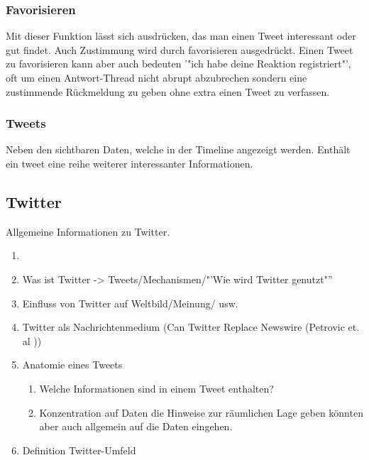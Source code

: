 		\subsubsection{Favorisieren}
			Mit dieser Funktion lässt sich ausdrücken, das man einen Tweet interessant oder gut findet.
			Auch Zustimmung wird durch favorisieren ausgedrückt.  
			Einen Tweet zu favorisieren kann aber auch bedeuten '"ich habe deine Reaktion registriert"', oft um einen Antwort-Thread nicht abrupt abzubrechen sondern eine zustimmende Rückmeldung zu geben ohne extra einen Tweet zu verfassen.

 		
	 	\subsubsection{Tweets}
	 		Neben den sichtbaren Daten, welche in der Timeline angezeigt werden. 
	 		Enthält ein tweet eine reihe weiterer interessanter Informationen. 
	 		  
	 		
	 	\subsubsection{}


		\subsection{Twitter}
			Allgemeine Informationen zu Twitter. 
			\begin{enumerate}
			\item {} 
				\item Was ist Twitter -> Tweets/Mechanismen/"'Wie wird Twitter genutzt"''
				\item {} Einfluss von Twitter auf Weltbild/Meinung/ usw.
				\item Twitter als Nachrichtenmedium (Can Twitter Replace Newswire (Petrovic et. al ))
				\item Anatomie eines Tweets 
					\begin{enumerate}
						\item Welche Informationen sind in einem Tweet enthalten? 
						\item Konzentration auf Daten die Hinweise zur räumlichen Lage geben könnten aber auch allgemein auf die Daten eingehen.
					\end{enumerate}

					\item Definition Twitter-Umfeld
			\end{enumerate} 



